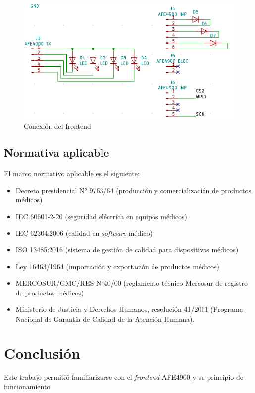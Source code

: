 \documentclass[
    11pt,
    spanish,
	a4paper
]{article}
\begin{document}
\begin{figure}[h!]
    \centering
    \includegraphics[width=\textwidth]{img/AFEsch.png}
    \caption{Conexión del frontend}
    \label{fig:stm32}
\end{figure}

\subsection{Normativa aplicable}
\label{subsec:normativa}

El marco normativo aplicable es el siguiente:

\begin{itemize}
    \item Decreto presidencial N° 9763/64 (producción y comercialización de productos médicos)
    \item IEC 60601-2-20 (seguridad eléctrica en equipos médicos)
    \item IEC 62304:2006 (calidad en \emph{software} médico)
    \item ISO 13485:2016 (sistema de gestión de calidad para dispositivos médicos)
    \item Ley 16463/1964 (importación y exportación de productos médicos)
    \item MERCOSUR/GMC/RES N°40/00 (reglamento técnico Mercosur de registro de productos médicos)
    \item Ministerio de Justicia y Derechos Humanos, resolución 41/2001 (Programa Nacional de Garantía de Calidad de la Atención Humana).
\end{itemize}

\section{Conclusión}
\label{suc:conclusion}

Este trabajo permitió familiarizarse con el \emph{frontend} AFE4900 y su principio de funcionamiento.
\end{document}
